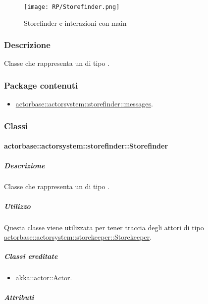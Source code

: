 \documentclass{scalatekids-article}
\begin{document}
\begin{figure}[H]
  \begin{center}
    \texttt{[image: RP/Storefinder.png]}
    \caption{Storefinder e interazioni con main}
  \end{center}
\end{figure}

\subsubsection{Descrizione}
Classe che rappresenta un  di tipo .

\subsubsection{Package contenuti}
\begin{itemize}
\item \hyperref[sec:actorbase::actorsystem::storefinder::messages]{actorbase::actorsystem::storefinder::messages}.
\end{itemize}

\subsubsection{Classi}

\paragraph{actorbase::actorsystem::storefinder::Storefinder}
\label{sec:actorbase::actorsystem::storefinder::Storefinder}

\subparagraph{Descrizione}

Classe che rappresenta un  di tipo .

\subparagraph{Utilizzo}
Questa classe viene utilizzata per tener traccia degli attori di tipo
\hyperref[sec:actorbase::actorsystem::storekeeper::Storekeeper]{actorbase::actorsystem::storekeeper::Storekeeper}.

\subparagraph{Classi ereditate}

\begin{itemize}

\item akka::actor::Actor.

\end{itemize}

\subparagraph{Attributi}
\end{document}
